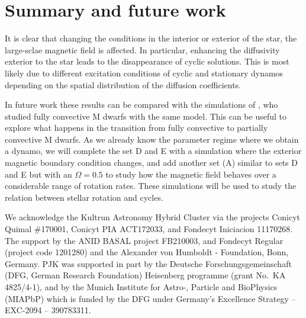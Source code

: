 \documentclass[baaa]{baaa}
\begin{document}


\section{Summary and future work}\label{final}

It is clear that changing the conditions in the interior or exterior of the star, the large-sclae magnetic field is affected. In particular, enhancing the diffusivity exterior to the star leads to the disappearance of cyclic solutions.
This is most likely due to different excitation conditions of cyclic and stationary dynamos depending on the spatial distribution of the diffusion coefficients.

 In future work these results can be compared with the simulations of \cite{caroo}, who studied fully convective M dwarfs with the same model. This can be useful to explore what happens in the transition from fully convective to partially convective M dwarfs.
As we already know the parameter regime where we obtain a dynamo, we will complete the set D and E with a simulation where the exterior magnetic boundary condition changes, and add another set (A) similar to sets D and E but with an $\Omega = 0.5$ to study how the magnetic field behaves over a considerable range of rotation rates.
These simulations will be used to study the relation between stellar rotation and cycles.

\begin{acknowledgement}
We acknowledge the Kultrun Astronomy Hybrid Cluster via the projects Conicyt
Quimal \#170001, Conicyt PIA ACT172033, and Fondecyt Iniciacion 11170268. The support by the ANID BASAL project FB210003, and Fondecyt Regular (project code 1201280) and the Alexander von Humboldt - Foundation, Bonn, Germany. PJK was supported in part by the Deutsche Forschungsgemeinschaft (DFG, German Research Foundation) Heisenberg programme (grant No.\ KA 4825/4-1), and by the Munich Institute for Astro-, Particle and BioPhysics (MIAPbP) which is funded by the DFG under Germany's Excellence Strategy – EXC-2094 – 390783311. 
\end{acknowledgement}
\end{document}
